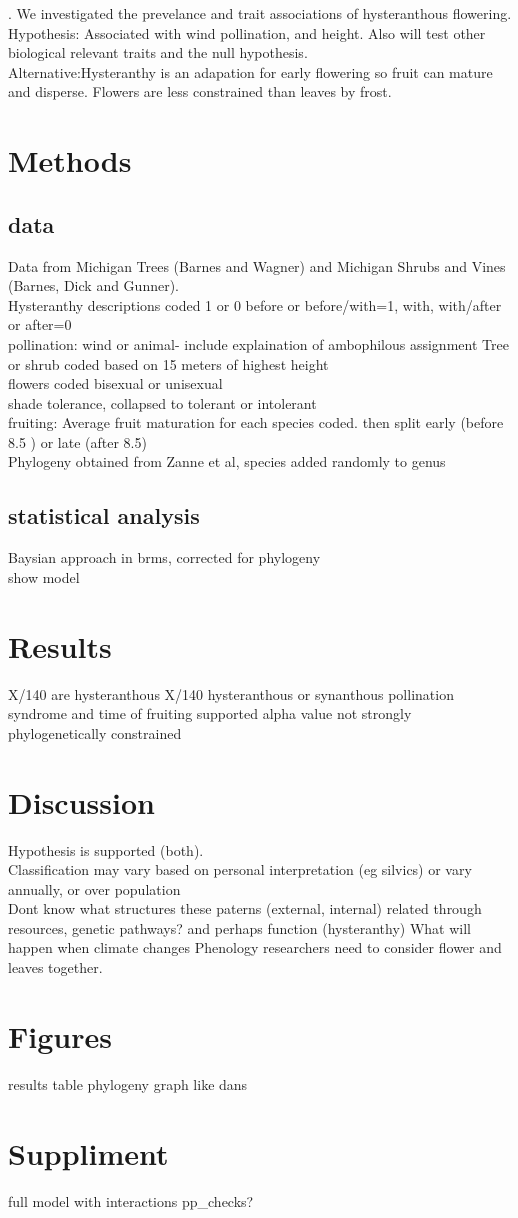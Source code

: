 \documentclass{article}\usepackage[]{graphicx}\usepackage[]{color}
\begin{document}
. We investigated the prevelance and trait associations of hysteranthous flowering.\\
Hypothesis: Associated with wind pollination, and height. Also will test other biological relevant traits and the null hypothesis.\\
Alternative:Hysteranthy is an adapation for early flowering so fruit can mature and disperse. Flowers are less constrained than leaves by frost.

\section{Methods}
\subsection{data}
Data from Michigan Trees (Barnes and Wagner) and Michigan Shrubs and Vines (Barnes, Dick and Gunner).\\
Hysteranthy descriptions coded 1 or 0 before or before/with=1, with, with/after or after=0\\
pollination: wind or animal- include explaination of ambophilous assignment
Tree or shrub coded based on 15 meters of highest height\\
flowers coded bisexual or unisexual\\
shade tolerance, collapsed to tolerant or intolerant\\
fruiting: Average fruit maturation for each species coded. then split early (before 8.5 ) or late (after 8.5)\\
Phylogeny obtained from Zanne et al, species added randomly to genus
\subsection{statistical analysis}
Baysian approach in brms, corrected for phylogeny\\
show model
\section{Results}
X/140 are hysteranthous
X/140 hysteranthous or synanthous
pollination syndrome and time of fruiting supported
alpha value not strongly phylogenetically constrained
\section{Discussion}
Hypothesis is supported (both).\\
Classification may vary based on personal interpretation (eg silvics) or vary annually, or over population\\
Dont know what structures these paterns (external, internal)
related through resources, genetic pathways? and perhaps function (hysteranthy)
What will happen when climate changes
Phenology researchers need to consider flower and leaves together.

\section{Figures}
results table
phylogeny
graph like dans
\section{Suppliment}
full model with interactions
pp_checks?
\end{document}
